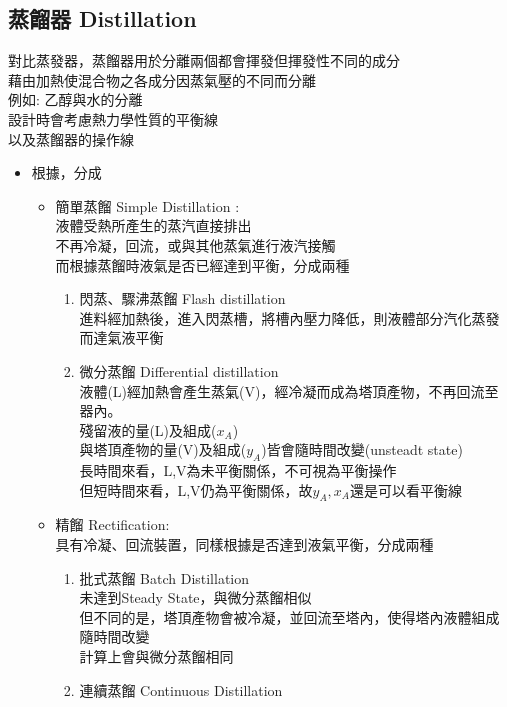\documentclass[../main.tex]{subfiles}
\begin{document}
\subsection{蒸餾器 Distillation}
對比蒸發器，蒸餾器用於分離兩個都會揮發但揮發性不同的成分\\
藉由加熱使混合物之各成分因蒸氣壓的不同而分離\\
例如: 乙醇與水的分離\\
設計時會考慮熱力學性質的平衡線\\
以及蒸餾器的操作線
\begin{itemize}
  \item 根據，分成
  \begin{itemize}
    \item 簡單蒸餾 Simple Distillation :\\
    液體受熱所產生的蒸汽直接排出\\
    不再冷凝，回流，或與其他蒸氣進行液汽接觸\\
    而根據蒸餾時液氣是否已經達到平衡，分成兩種
    \begin{enumerate}
      \item 閃蒸、驟沸蒸餾 Flash distillation\\
      進料經加熱後，進入閃蒸槽，將槽內壓力降低，則液體部分汽化蒸發而達氣液平衡
      \item 微分蒸餾 Differential distillation\\
      液體(L)經加熱會產生蒸氣(V)，經冷凝而成為塔頂產物，不再回流至器內。\\
      殘留液的量(L)及組成($x_A$)\\
      與塔頂產物的量(V)及組成($y_A$)皆會隨時間改變(unsteadt state)\\
      長時間來看，L,V為未平衡關係，不可視為平衡操作\\
      但短時間來看，L,V仍為平衡關係，故$y_A,x_A$還是可以看平衡線
    \end{enumerate}
    \item 精餾 Rectification:\\
    具有冷凝、回流裝置，同樣根據是否達到液氣平衡，分成兩種
    \begin{enumerate}
      \item 批式蒸餾 Batch Distillation\\
      未達到Steady State，與微分蒸餾相似\\
      但不同的是，塔頂產物會被冷凝，並回流至塔內，使得塔內液體組成隨時間改變\\
      計算上會與微分蒸餾相同
      \item 連續蒸餾 Continuous Distillation\\

\end{enumerate}
\end{itemize}
\end{itemize}
\end{document}
